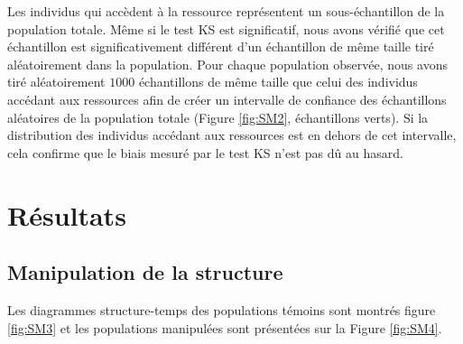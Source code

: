 Les individus qui accèdent à la ressource représentent un sous-échantillon de la
population totale. Même si le test KS est significatif, nous avons vérifié que
cet échantillon est significativement différent d'un échantillon de même taille
tiré aléatoirement dans la population. Pour chaque population observée, nous
avons tiré aléatoirement $1000$ échantillons de même taille que celui des
individus accédant aux ressources afin de créer un intervalle de confiance des
échantillons aléatoires de la population totale (Figure \ref{fig:SM2},
échantillons verts). Si la distribution des individus accédant aux ressources
est en dehors de cet intervalle, cela confirme que le biais mesuré par le test KS
n'est pas dû au hasard.




\section{Résultats}

\subsection{Manipulation de la structure}

Les diagrammes structure-temps des populations témoins sont montrés figure
\ref{fig:SM3} et les populations manipulées sont présentées sur la Figure
\ref{fig:SM4}.

